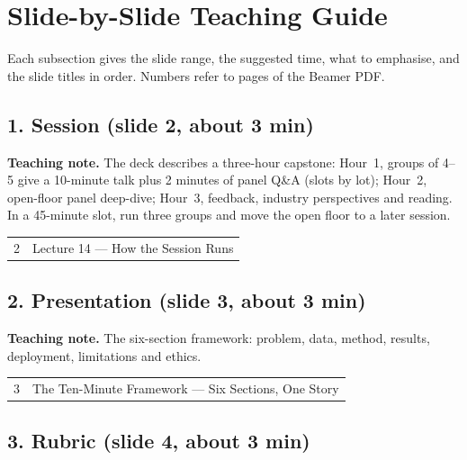 \documentclass[11pt]{article}
\begin{document}
\section{Slide-by-Slide Teaching Guide}

Each subsection gives the slide range, the suggested time, what to emphasise, and the slide titles in order. Numbers refer to pages of the Beamer PDF.

\subsection{1. Session \normalfont\small\color{GreyN}(slide 2, about 3 min)}

\textbf{Teaching note.} The deck describes a three-hour capstone: Hour~1, groups of 4--5 give a 10-minute talk plus 2 minutes of panel Q\&A (slots by lot); Hour~2, open-floor panel deep-dive; Hour~3, feedback, industry perspectives and reading. In a 45-minute slot, run three groups and move the open floor to a later session.

\begin{center}\small\renewcommand{\arraystretch}{1.1}\begin{tabularx}{\textwidth}{@{}r X@{}}2 & Lecture 14 --- How the Session Runs\\\end{tabularx}\end{center}

\subsection{2. Presentation \normalfont\small\color{GreyN}(slide 3, about 3 min)}

\textbf{Teaching note.} The six-section framework: problem, data, method, results, deployment, limitations and ethics.

\begin{center}\small\renewcommand{\arraystretch}{1.1}\begin{tabularx}{\textwidth}{@{}r X@{}}3 & The Ten-Minute Framework --- Six Sections, One Story\\\end{tabularx}\end{center}

\subsection{3. Rubric \normalfont\small\color{GreyN}(slide 4, about 3 min)}
\end{document}
